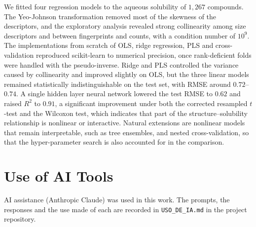 \documentclass[conference]{IEEEtran}
\begin{document}
We fitted four regression models to the aqueous solubility of $1{,}267$
compounds. The Yeo-Johnson transformation removed most of the skewness
of the descriptors, and the exploratory analysis revealed strong
collinearity among size descriptors and between fingerprints and
counts, with a condition number of $10^{9}$. The
implementations from scratch of OLS, ridge regression, PLS and
cross-validation reproduced scikit-learn to numerical precision, once
rank-deficient folds were handled with the pseudo-inverse. Ridge and
PLS controlled the variance caused by collinearity and improved
slightly on OLS, but the three linear models remained statistically
indistinguishable on the test set, with RMSE around $0.72$--$0.74$. A
single hidden layer neural network lowered the test RMSE to $0.62$ and
raised $R^2$ to $0.91$, a significant improvement under both the
corrected resampled $t$-test and the Wilcoxon test, which indicates
that part of the structure--solubility relationship is nonlinear or
interactive. Natural extensions are nonlinear models that remain
interpretable, such as tree ensembles, and nested cross-validation, so
that the hyper-parameter search is also accounted for in the
comparison.

\section*{Use of AI Tools}
AI assistance (Anthropic Claude) was used in this work. The prompts,
the responses and the use made of each are recorded in
\texttt{USO\_DE\_IA.md} in the project repository.



\end{document}

